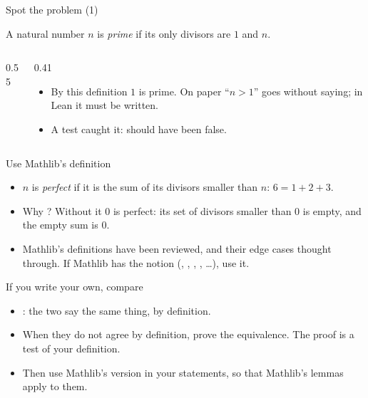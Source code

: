 \documentclass[10pt, aspectratio=169]{beamer}
\begin{document}
\begin{frame}[fragile,t]{Spot the problem (1)}
\begin{paper}[Definition]
A natural number $n$ is \emph{prime} if its only divisors are $1$ and $n$.
\end{paper}

\pause
\begin{columns}[T]
\begin{column}{0.55\textwidth}
\end{column}
\begin{column}{0.41\textwidth}
\begin{itemize}
\item By this definition $1$ is prime. On paper ``$n > 1$'' goes without saying; in Lean it must be written.
\item A test caught it:  should have been false.
\end{itemize}
\end{column}
\end{columns}
\end{frame}

\begin{frame}[fragile]{Use Mathlib's definition}

\vspace{0.4em}
\begin{itemize}
\item $n$ is \emph{perfect} if it is the sum of its divisors smaller than $n$: $6 = 1 + 2 + 3$.
\item Why ? Without it $0$ is perfect: its set of divisors smaller than $0$ is empty, and the empty sum is $0$.
\item Mathlib's definitions have been reviewed, and their edge cases thought through. If Mathlib has the notion (, , , , \dots), use it.
\end{itemize}
\end{frame}

\begin{frame}[fragile]{If you write your own, compare}

\vspace{0.4em}
\begin{itemize}
\item {}: the two say the same thing, by definition.
\item When they do not agree by definition, prove the equivalence. The proof is a test of your definition.
\item Then use Mathlib's version in your statements, so that Mathlib's lemmas apply to them.
\end{itemize}
\end{frame}
\end{document}
